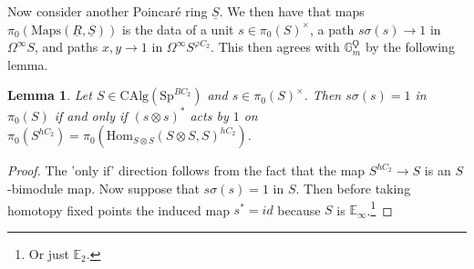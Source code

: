 \documentclass{article}
\renewcommand{\phi}{\varphi}
\newtheorem{lemma}[theorem]{Lemma}
\theoremstyle{definition}
\begin{document}
Now consider another Poincar{\'e} ring $\underline{S}$. We then have that maps $\pi_0(\mathrm{Maps}(\underline{R},\underline{S}))$ is the data of a unit $s\in \pi_0(S)^\times$, a path $s\sigma(s)\to 1$ in $\Omega^\infty S$, and paths $x,y\to 1$ in $\Omega^\infty S^{\phi C_2}$.  This then agrees with $\mathbb{G}_m^\Qoppa$ by the following lemma.

\begin{lemma}
Let $S\in \mathrm{CAlg}(\mathrm{Sp}^{BC_2})$ and $s\in \pi_0(S)^\times$. Then $s\sigma(s)=1$ in $\pi_0(S)$ if and only if $(s\otimes s)^*$ acts by $1$ on $\pi_0(S^{hC_2})=\pi_0(\mathrm{Hom}_{S\otimes S}(S\otimes S, S)^{hC_2})$.
\end{lemma}
\begin{proof}
The 'only if' direction follows from the fact that the map $S^{hC_2}\to S$ is an $S$-bimodule map. Now suppose that $s\sigma(s)=1$ in  $S$. Then before taking homotopy fixed points the induced map $s^*=id$ because $S$ is $\mathbb{E}_\infty$.\footnote{Or just $\mathbb{E}_2$.} 
\end{proof}

\printbibliography
\end{document}
